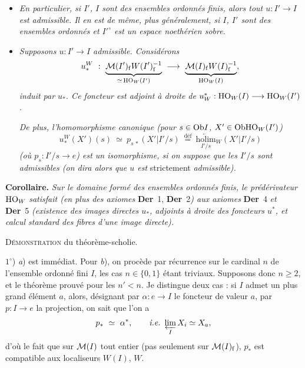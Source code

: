 \dgrchunkbegin


\begin{itemize}[leftmargin=3em]
\item[c)] \textit{En particulier, si $I'$, $I$ sont des ensembles ordonnés finis, alors tout $u : I' \longrightarrow I$ est admissible. Il en est de même, plus généralement, si $I$, $I'$ sont des ensembles ordonnés et $I'^{\circ}$ est un espace noethérien sobre.}
\end{itemize}

\begin{itemize}[leftmargin=2em]
\item[2)] \textit{Supposons $u : I' \longrightarrow I$ admissible. Considérons}
\[
u_*^W \ : \ \underbrace{\cM(I')_{\rf}W(I')_{\rf}^{-1}}_{\simeq\, \HO_W(I')} \ \longrightarrow \ \underbrace{\cM(I)_{\rf}W(I)_{\rf}^{-1}}_{\HO_W(I)},
\]
\textit{induit par $u_*$. Ce foncteur est adjoint à droite de $u_W^* : \mathrm{HO}_W(I) \longrightarrow \mathrm{HO}_W(I')$.}

\textit{De plus, l'homomorphisme canonique (pour $s \in \mathrm{Ob} I$, $X' \in \mathrm{Ob} \mathrm{HO}_W(I')$)}
\[
u_*^W(X')(s) \ \simeq \ p_{s\,*}(X'|I'/s) \ \overset{\text{déf}}{=} \ \underset{I'/s}{\underleftarrow{\mathrm{holim}}}{}_W(X'|I'/s)
\]
\textit{(où $p_s : I'/s \longrightarrow e$) est un isomorphisme, si on suppose que les $I'/s$ sont admissibles (on dira alors que $u$ est} strictement \textit{admissible).}
\end{itemize}

\textbf{Corollaire.} \textit{Sur le domaine formé des ensembles ordonnés finis, le prédérivateur} $\mathrm{HO}_W$ \textit{satisfait (en plus des axiomes} \textbf{Der}~1, \textbf{Der}~2\textit{) aux axiomes} \textbf{Der}~4 \textit{et} \textbf{Der}~5 \textit{(existence des images directes $u_*$, adjoints à droite des foncteurs $u^*$, et calcul standard des fibres d'une image directe).}

\textsc{Démonstration} du théorème-scholie.

$1^\circ$) \textit{a}) est immédiat. Pour \textit{b}), on procède par récurrence sur le cardinal $n$ de l'ensemble ordonné fini $I$, les cas $n \in \{0,1\}$ étant triviaux. Supposons donc $n \geq 2$, et le théorème prouvé pour les $n' < n$. Je distingue deux cas : si $I$ admet un plus grand élément $a$, alors, désignant par $\alpha : e \longrightarrow I$ le foncteur de valeur $a$, par $p : I \longrightarrow e$ la projection, on sait que l'on a
\[
p_* \ \simeq \ \alpha^*, \qquad \textit{i.e.} \ \varprojlim_{I} X_i \simeq X_a,
\]
d'où le fait que sur $\mathcal{M}(I)$ tout entier
(pas seulement sur $\mathcal{M}(I)_{\mathrm{f}}$), $p_*$ est compatible aux localiseurs $W(I)$, $W$.

